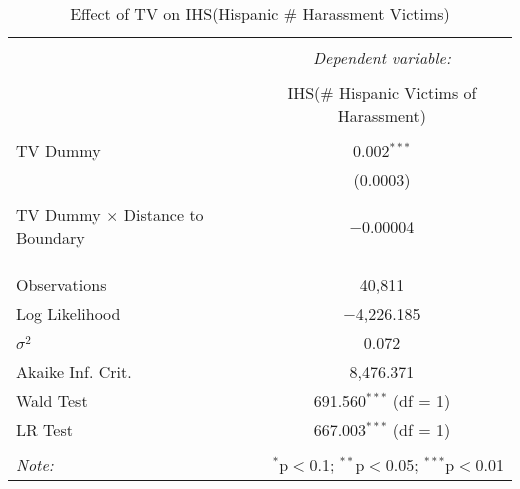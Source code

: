 
\begin{table}[!htbp] \centering 
  \caption{Effect of TV on IHS(Hispanic \# Harassment Victims)} 
  \label{} 
\begin{tabular}{@{\extracolsep{-2pt}}lc} 
\\[-1.8ex]\hline 
\hline \\[-1.8ex] 
 & \multicolumn{1}{c}{\textit{Dependent variable:}} \\ 
\cline{2-2} 
\\[-1.8ex] & IHS(\# Hispanic Victims of Harassment) \\ 
\hline \\[-1.8ex] 
 TV Dummy & 0.002$^{***}$ \\ 
  & (0.0003) \\ 
  & \\ 
 TV Dummy $\times$ Distance to Boundary & $-$0.00004 \\ 
  &  \\ 
  & \\ 
\hline \\[-1.8ex] 
Observations & 40,811 \\ 
Log Likelihood & $-$4,226.185 \\ 
$\sigma^{2}$ & 0.072 \\ 
Akaike Inf. Crit. & 8,476.371 \\ 
Wald Test & 691.560$^{***}$ (df = 1) \\ 
LR Test & 667.003$^{***}$ (df = 1) \\ 
\hline 
\hline \\[-1.8ex] 
\textit{Note:}  & \multicolumn{1}{r}{$^{*}$p$<$0.1; $^{**}$p$<$0.05; $^{***}$p$<$0.01} \\ 
\end{tabular} 
\end{table} 
